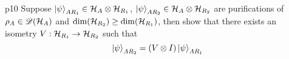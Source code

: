 \documentclass[a4paper, 11pt]{article}
\begin{document}

\begin{problem}{%
	}{p10%
	}
	Suppose $\ket{\psi}_{AR_1}\in \mathcal{H}_{A}\otimes \mathcal{H}_{R_1}$, $\ket{\psi}_{AR_2}\in \mathcal{H}_A\otimes \mathcal{H}_{R_2}$ are purifications of  $\rho_A\in {\mathscr{D}}(\mathcal{H}_A)$ and $\dim(\mathcal{H}_{R_2})\geq \dim(\mathcal{H}_{R_1})$, then show that  there exists an isometry $V:\mathcal{H}_{R_1}\to \mathcal{H}_{R_2}$  such that $$\ket{\psi}_{AR_2}=(V\otimes I)\ket{\psi}_{AR_1}$$
\end{problem}

\end{document}
